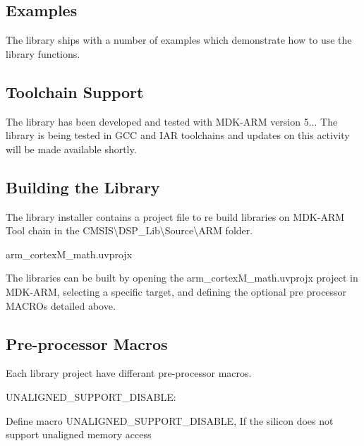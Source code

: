 \subsection*{Examples }

The library ships with a number of examples which demonstrate how to use the library functions.

\subsection*{Toolchain Support }

The library has been developed and tested with M\-D\-K-\/\-A\-R\-M version 5... The library is being tested in G\-C\-C and I\-A\-R toolchains and updates on this activity will be made available shortly.

\subsection*{Building the Library }

The library installer contains a project file to re build libraries on M\-D\-K-\/\-A\-R\-M Tool chain in the {\ttfamily C\-M\-S\-I\-S\textbackslash{}D\-S\-P\-\_\-\-Lib\textbackslash{}Source\textbackslash{}A\-R\-M} folder.
\begin{DoxyItemize}
\item arm\-\_\-cortex\-M\-\_\-math.\-uvprojx
\end{DoxyItemize}

The libraries can be built by opening the arm\-\_\-cortex\-M\-\_\-math.\-uvprojx project in M\-D\-K-\/\-A\-R\-M, selecting a specific target, and defining the optional pre processor M\-A\-C\-R\-Os detailed above.

\subsection*{Pre-\/processor Macros }

Each library project have differant pre-\/processor macros.


\begin{DoxyItemize}
\item U\-N\-A\-L\-I\-G\-N\-E\-D\-\_\-\-S\-U\-P\-P\-O\-R\-T\-\_\-\-D\-I\-S\-A\-B\-L\-E\-:
\end{DoxyItemize}

Define macro U\-N\-A\-L\-I\-G\-N\-E\-D\-\_\-\-S\-U\-P\-P\-O\-R\-T\-\_\-\-D\-I\-S\-A\-B\-L\-E, If the silicon does not support unaligned memory access


